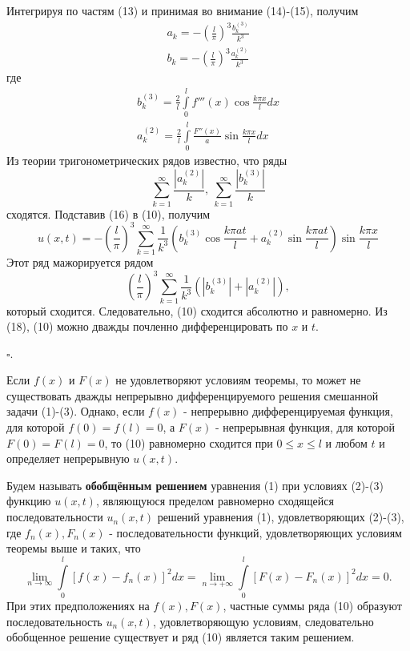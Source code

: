 Интегрируя по частям (13) и принимая во внимание (14)-(15), получим
\[
	\begin{aligned}
		a_k = - \left( \frac{l}{\pi} \right)^3 \frac{b_k^{(3)}}{k^3} \\
		b_k = - \left( \frac{l}{\pi} \right)^3 \frac{a_k^{(2)}}{k^3}
	\end{aligned}
	\tag{16}
\]
где
\[
	\begin{aligned}
		b_k^{(3)} = \frac{2}{l} \int\limits_0^l f'''(x) \cos \frac{k \pi x}{l} dx \\
		a_k^{(2)} = \frac{2}{l} \int\limits_0^l \frac{F''(x)}{a} \sin \frac{k \pi x}{l} dx
	\end{aligned}
	\tag{17}
\]
Из теории тригонометрических рядов известно, что ряды
\[
	\sum_{k=1}^\infty \frac{\left| a_k^{(2)} \right|}{k}, ~ \sum_{k=1}^\infty \frac{\left| b_k^{(3)} \right|}{k} \tag{18}
\]
сходятся. Подставив (16) в (10), получим
\[
	u(x, t) = - \left( \frac{l}{\pi} \right)^3 \sum_{k=1}^\infty \frac{1}{k^3} \left( b_k^{(3)} \cos \frac{k \pi at}{l} + a_k^{(2)} \sin \frac{k \pi at}{l} \right) \sin \frac{k \pi x}{l} \tag{19}
\]
Этот ряд мажорируется рядом
\[
	\left( \frac{l}{\pi} \right)^3 \sum_{k=1}^\infty \frac{1}{k^3} \left( \left| b_k^{(3)} \right| + \left| a_k^{(2)} \right| \right),
\]
который сходится. Следовательно, (10) сходится абсолютно и равномерно. Из (18), (10) можно дважды почленно дифференцировать по $x$ и $t$.

$\square$.

Если $f(x)$ и $F(x)$ не удовлетворяют условиям теоремы, то может не существовать дважды непрерывно дифференцируемого решения смешанной задачи (1)-(3). Однако, если $f(x)$ - непрерывно дифференцируемая функция, для которой $f(0) = f(l) = 0$, а $F(x)$ - непрерывная функция, для которой $F(0) = F(l) = 0$, то (10) равномерно сходится при $0 \le x \le l$ и любом $t$ и определяет непрерывную $u(x, t)$.

Будем называть \textbf{обобщённым решением} уравнения (1) при условиях (2)-(3) функцию $u(x, t)$, являющуюся пределом равномерно сходящейся последовательности $u_n (x,t)$ решений уравнения (1), удовлетворяющих (2)-(3), где $f_n(x), F_n(x)$ - последовательности функций, удовлетворяющих условиям теоремы выше и таких, что
\[
	\lim\limits_{n \to \infty} \int\limits_0^l \left[ f(x) - f_n (x) \right]^2 dx = \lim\limits_{n \to +\infty} \int\limits_0^l \left[ F(x) - F_n (x) \right]^2 dx = 0.
\]
При этих предположениях на $f(x), F(x)$, частные суммы ряда (10) образуют последовательность $u_n(x, t)$, удовлетворяющую условиям, следовательно обобщенное решение существует и ряд (10) является таким решением.

